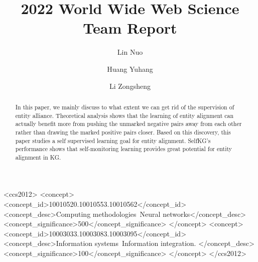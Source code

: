 \documentclass[sigconf]{acmart}
\begin{document}
\title{2022 World Wide Web Science Team Report}

\author{Lin Nuo}

\author{Huang Yuhang}

\author{Li Zongsheng}


\renewcommand{\shortauthors}{Lin and Huang, et al.}

\begin{abstract}

  In this paper, we mainly discuss to what extent we can get rid of the supervision of entity alliance. Theoretical analysis shows that the learning of entity alignment can actually benefit more from pushing the unmarked negative pairs away from each other rather than drawing the marked positive pairs closer. Based on this discovery, this paper studies a self supervised learning goal for entity alignment. SelfKG's performance shows that self-monitoring learning provides great potential for entity alignment in KG.
  
\end{abstract}

\begin{CCSXML}
<ccs2012>
 <concept>
  <concept_id>10010520.10010553.10010562</concept_id>
  <concept_desc>Computing methodologies~Neural networks</concept_desc>
  <concept_significance>500</concept_significance>
 </concept>
 <concept>
  <concept_id>10003033.10003083.10003095</concept_id>
  <concept_desc>Information systems~Information integration.
</concept_desc>
  <concept_significance>100</concept_significance>
 </concept>
</ccs2012>
\end{CCSXML}
\end{document}
